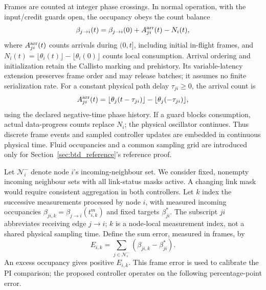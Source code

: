 Frames are counted at integer phase crossings. In normal operation, with
the input/credit guards open, the occupancy obeys the count balance
\begin{equation}
 \beta_{j\to i}(t)=\beta_{j\to i}(0)+A^{\rm arr}_{ji}(t)-N_i(t),
 \label{eq:fpi_count_balance}
\end{equation}
where $A^{\rm arr}_{ji}(t)$ counts arrivals during $(0,t]$, including
initial in-flight frames, and
$N_i(t)=\lfloor\theta_i(t)\rfloor-\lfloor\theta_i(0)\rfloor$ counts
local consumption. Arrival ordering and initialization retain the Callisto
marking and prehistory. Its variable-latency extension preserves frame
order and may release batches; it assumes no finite serialization rate.
For a constant physical path delay $\tau_{ji}\ge0$, the arrival count is
\begin{equation}
 A^{\rm arr}_{ji}(t)=\lfloor\theta_j(t-\tau_{ji})\rfloor
                     -\lfloor\theta_j(-\tau_{ji})\rfloor,
 \label{eq:fpi_fixed_delay_arrivals}
\end{equation}
using the declared negative-time phase history.
If a guard blocks consumption, actual data-progress counts replace $N_i$;
the physical oscillator continues. Thus discrete frame events and sampled
controller updates are embedded in continuous physical time. Fluid
occupancies and a common sampling grid are introduced only for Section~\ref{sec:btd_reference}'s
reference proof.

Let $\mathcal N_i^-$ denote node $i$'s incoming-neighbour set. We consider fixed, nonempty incoming neighbour sets with all link-status
masks active. A changing link mask would require consistent aggregation in
both controllers. Let $k$ index the successive measurements processed by node $i$, with measured
incoming occupancies $\beta_{ji,k}=\beta_{j\to i}(t^m_{i,k})$ and fixed targets $\beta^*_{ji}$.
The subscript $ji$ abbreviates receiving edge $j\to i$; $k$ is a node-local
measurement index, not a shared physical sampling time. Define
the sum error, measured in frames, by
\begin{equation}
 E_{i,k}=\sum_{j\in\mathcal N_i^-}(\beta_{ji,k}-\beta^*_{ji}).
 \label{eq:fpi_error}
\end{equation}
An excess occupancy gives positive $E_{i,k}$. This frame error is used to
calibrate the PI comparison; the proposed controller operates on the
following percentage-point error.

